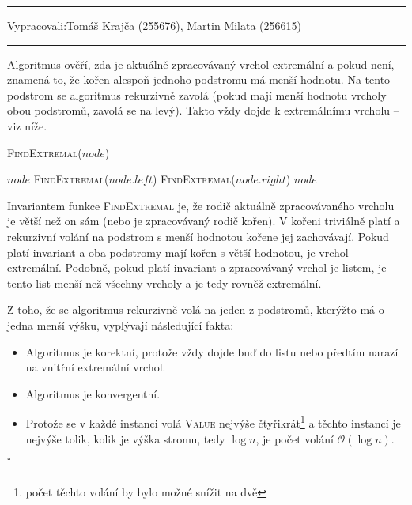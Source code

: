 \documentclass[12pt]{article}
\renewcommand{\O}{\mathcal{O}}
\newcommand{\zadani}[2]{
{\large
\noindent {\bf IB108 \hfill{} Sada #1, Příklad #2 \\[-4mm]}
\noindent\hrule
\vspace{2mm}
\noindent Vypracovali:\hfill{}Tomáš Krajča (255676), Martin Milata (256615)
\vspace{3mm}
\hrule
\bigskip\bigskip}
}
\begin{document}
\clearpage
\zadani{2}{5}

\noindent
Algoritmus ověří, zda je aktuálně zpracovávaný vrchol extremální a pokud není, znamená to, že kořen
alespoň jednoho podstromu má menší hodnotu. Na tento podstrom se algoritmus rekurzivně zavolá (pokud
mají menší hodnotu vrcholy obou podstromů, zavolá se na levý). Takto vždy dojde k extremálnímu
vrcholu -- viz níže.

\begin{algorithm}
\textsc{FindExtremal}($node$)
\begin{algorithmic}
\RETURN $node$
\RETURN \textsc{FindExtremal}($node.left$)
\RETURN \textsc{FindExtremal}($node.right$)
\ELSE
\RETURN $node$
\ENDIF
\end{algorithmic}
\end{algorithm}

Invariantem funkce \textsc{FindExtremal} je, že rodič aktuálně zpracovávaného vrcholu je větší než
on sám (nebo je zpracovávaný rodič kořen). V kořeni triviálně platí a rekurzivní volání na podstrom
s menší hodnotou kořene jej zachovávají. Pokud platí invariant a oba podstromy mají kořen s větší
hodnotou, je vrchol extremální. Podobně, pokud platí invariant a zpracovávaný vrchol je listem, je
tento list menší než všechny vrcholy a je tedy rovněž extremální.

Z toho, že se algoritmus rekurzivně volá na jeden z podstromů, kterýžto má o jedna menší výšku,
vyplývají následující fakta:

\begin{itemize}
\item Algoritmus je korektní, protože vždy dojde buď do listu nebo předtím narazí na vnitřní
extremální vrchol.
\item Algoritmus je konvergentní.
\item Protože se v každé instanci volá \textsc{Value} nejvýše čtyřikrát\footnote{počet těchto volání
by bylo možné snížit na dvě} a těchto instancí je nejvýše tolik, kolik je výška stromu, tedy $\log
n$, je počet volání $\O(\log n)$.
\end{itemize}

\hfill$\square$
\end{document}
